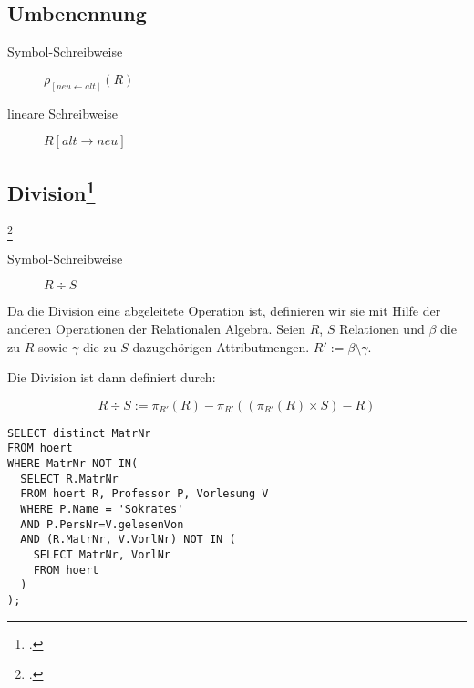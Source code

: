 \documentclass{bschlangaul-haupt}
\begin{document}
%

\subsection{Umbenennung}

\begin{description}
\item[Symbol-Schreibweise] $\rho_{[{neu}\leftarrow alt]} (R)$
\item[lineare Schreibweise] $R[alt\rightarrow neu]$
\end{description}

%

\subsection{Division\footcite[Division]{wiki:relationale-algebra}}

\footcite[Seite 31-43]{db:fs:2}

\begin{description}
\item[Symbol-Schreibweise] $R \div S$
\end{description}

\noindent
Da die Division eine abgeleitete Operation ist, definieren wir sie mit
Hilfe der anderen Operationen der Relationalen Algebra. Seien $R$, $S$
Relationen und $\beta$ die zu $R$ sowie $\gamma$ die zu $S$
dazugehörigen Attributmengen. $R':=\beta \setminus \gamma$.

Die Division ist dann definiert durch:

\begin{displaymath}
R\div S :=
\pi_{R'}(R) -
\pi_{R'}((\pi_{R'}(R) \times S) - R)
\end{displaymath}

\begin{verbatim}
SELECT distinct MatrNr
FROM hoert
WHERE MatrNr NOT IN(
  SELECT R.MatrNr
  FROM hoert R, Professor P, Vorlesung V
  WHERE P.Name = 'Sokrates'
  AND P.PersNr=V.gelesenVon
  AND (R.MatrNr, V.VorlNr) NOT IN (
    SELECT MatrNr, VorlNr
    FROM hoert
  )
);
\end{verbatim}

%
\end{document}
